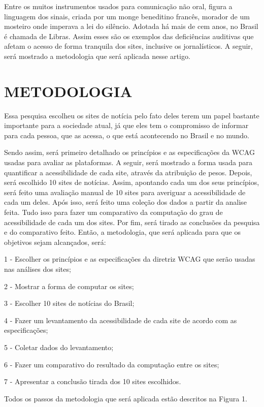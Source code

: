 \documentclass[a4paper]{article}
\begin{document}
\begin{titlepage}
Entre os muitos instrumentos usados para comunicação não oral, figura a linguagem dos sinais, criada por um monge beneditino francês, morador de um mosteiro onde imperava a lei do silêncio. Adotada há mais de cem anos, no Brasil é chamada de Libras. Assim esses são os exemplos das deficiências auditivas que afetam o acesso de forma tranquila dos sites, inclusive os jornalísticos. A seguir, será mostrado a metodologia que será aplicada nesse artigo.

\section{METODOLOGIA}
Essa pesquisa escolheu os sites de notícia pelo fato deles terem um papel bastante importante para a sociedade atual, já que eles tem o compromisso de informar para cada pessoa, que as acessa, o que está acontecendo no Brasil e no mundo.

Sendo assim, será primeiro detalhado os princípios e as especificações da WCAG usadas para avaliar as plataformas.
A seguir, será mostrado a forma usada para quantificar a acessibilidade de cada site, através da atribuição de pesos.
Depois, será escolhido 10 sites de notícias.
Assim, apontando cada um dos seus princípios, será feito uma avaliação manual de 10 sites para averiguar a acessibilidade de cada um deles.
Após isso, será feito uma coleção dos dados a partir da analise feita.
Tudo isso para fazer um comparativo da computação do grau de acessibilidade de cada um dos sites.
Por fim, será tirado as conclusões da pesquisa e do comparativo feito.
Então, a metodologia, que será aplicada para que os objetivos sejam alcançados, será:

1 - Escolher os princípios e as especificações da diretriz WCAG que serão usadas nas análises dos sites;

2 - Mostrar a forma de computar os sites;

3 - Escolher 10 sites de notícias do Brasil;

4 - Fazer um levantamento da acessibilidade de cada site de acordo com as especificações;

5 - Coletar dados do levantamento;

6 - Fazer um comparativo do resultado da computação entre os sites;

7 - Apresentar a conclusão tirada dos 10 sites escolhidos.

Todos os passos da metodologia que será aplicada estão descritos na Figura 1.


\end{titlepage}
\end{document}
